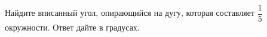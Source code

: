\begin{ex}
	\begin{condition}
		Найдите вписанный угол, опирающийся на дугу, которая составляет \( \dfrac{1}{5} \)  окружности. Ответ дайте в градусах.
	\end{condition}
\end{ex}